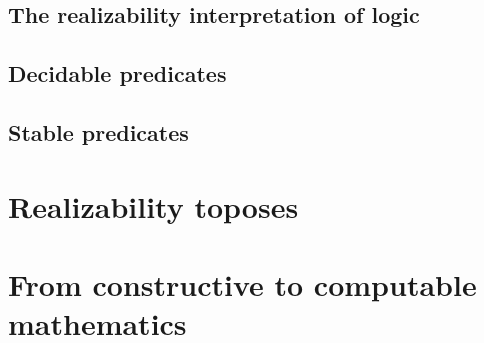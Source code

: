 \subsection{The realizability interpretation of logic}
\label{sec:realizability-interpretation}


\subsection{Decidable predicates}
\label{sec:decidable-predicates}


\subsection{Stable predicates}
\label{sec:stable-predicates}




\section{Realizability toposes}
\label{sec:realizability-toposes}

\section{From constructive to computable mathematics}
\label{sec:constructive-math}





